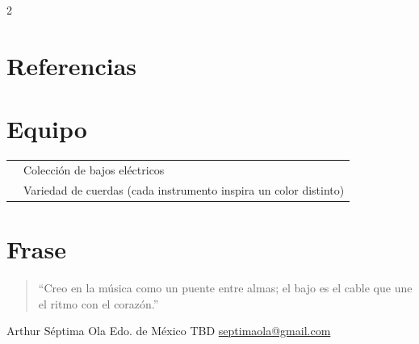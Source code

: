 \documentclass[grey]{hipstercv}
\newlength{\rightcolwidth}
\begin{document}
\begin{paracol}{2}
\begin{minipage}[t]{0.35\textwidth}
\section*{Referencias}
\end{minipage}\hfill
\begin{minipage}[t]{0.3\textwidth}
\section*{Equipo}
\begin{tabular}{>{\footnotesize\bfseries}r >{\footnotesize}p{}}
    & Colección de bajos eléctricos \\
    & Variedad de cuerdas (cada instrumento inspira un color distinto)
\end{tabular}

\section*{Frase}
\begin{quote}\footnotesize
``Creo en la música como un puente entre almas; el bajo es el cable que une el ritmo con el corazón.''
\end{quote}
\end{minipage}









\vfill{} %

\setlength{\parindent}{0pt}
\begin{minipage}[t]{\rightcolwidth}
\begin{center}\fontfamily{\sfdefault}\selectfont \color{black!70}
{\small Arthur  Séptima Ola  Edo. de México  TBD \newline{} \protect\url{septimaola@gmail.com}
}
\end{center}
\end{minipage}


\end{paracol}
\end{document}
